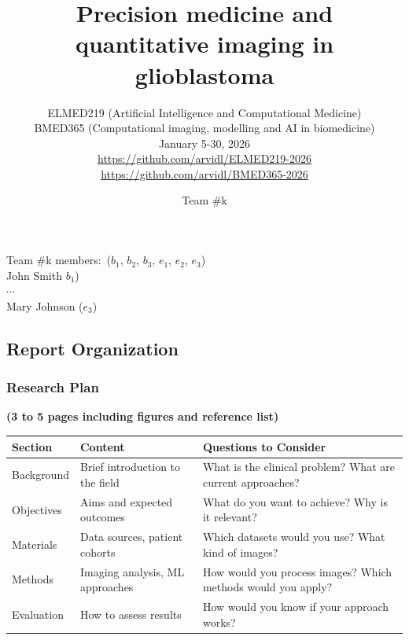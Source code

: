 \documentclass[11pt]{article}
\title{Precision medicine and quantitative imaging in glioblastoma}
\author{ELMED219 (Artificial Intelligence and Computational Medicine) \\
BMED365  (Computational imaging, modelling and AI in biomedicine) \\
January 5-30, 2026\\
{\footnotesize \url{https://github.com/arvidl/ELMED219-2026}} \\
{\footnotesize \url{https://github.com/arvidl/BMED365-2026}}}
\date{Team \#k}
\begin{document}
\maketitle


\noindent Team \#k members:\, ($b_1$, $b_2$, $b_3$, $e_1$, $e_2$, $e_3$) \\

\noindent John Smith $b_1$)\\
$\cdots$\\
 Mary Johnson ($e_3$)

\begin{scriptsize}
\subsection*{Report Organization}
\subsubsection*{Research Plan}
\textbf{(3 to 5 pages including figures and reference list)}
\begin{table}[htbp]
\centering
\scriptsize
\begin{tabular}{p{3cm}p{4.5cm}p{6.5cm}}
\toprule
\textbf{Section} & \textbf{Content} & \textbf{Questions to Consider} \\
\midrule
Background & Brief introduction to the field & What is the clinical problem? What are current approaches? \\
Objectives & Aims and expected outcomes & What do you want to achieve? Why is it relevant? \\
Materials & Data sources, patient cohorts & Which datasets would you use? What kind of images? \\
Methods & Imaging analysis, ML approaches & How would you process images? Which methods would you apply? \\
Evaluation & How to assess results & How would you know if your approach works? \\
\bottomrule
\end{tabular}
\end{table}

\end{scriptsize}
\end{document}
